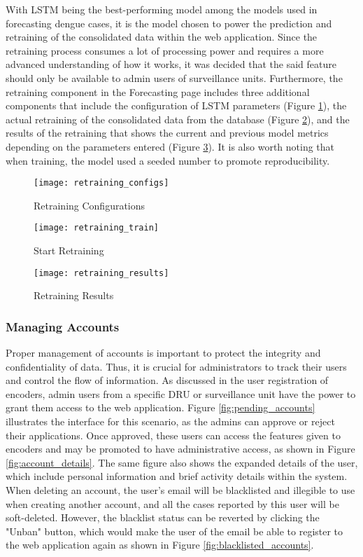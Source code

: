 With LSTM being the best-performing model among the models used in forecasting dengue cases, it is the model chosen to power the prediction and retraining of the consolidated data within the web application. Since the retraining process consumes a lot of processing power and requires a more advanced understanding of how it works, it was decided that the said feature should only be available to admin users of surveillance units. Furthermore, the retraining component in the Forecasting page includes three additional components that include the configuration of LSTM parameters (Figure \ref{fig:retraining_configs}), the actual retraining of the consolidated data from the database (Figure \ref{fig:retraining_train}), and the results of the retraining that shows the current and previous model metrics depending on the parameters entered (Figure \ref{fig:retraining_results}). It is also worth noting that when training, the model used a seeded number to promote reproducibility. 

\begin{figure}[H]
	\centering
	\texttt{[image: retraining\_configs]}
	\caption{Retraining Configurations}
	\label{fig:retraining_configs}
\end{figure}
\begin{figure}[H]
	\centering
	\texttt{[image: retraining\_train]}
	\caption{Start Retraining}
	\label{fig:retraining_train}
\end{figure}
\begin{figure}[H]
	\centering
	\texttt{[image: retraining\_results]}
	\caption{Retraining Results}
	\label{fig:retraining_results}
\end{figure}

\clearpage

\subsubsection{Managing Accounts}

Proper management of accounts is important to protect the integrity and confidentiality of data. Thus, it is crucial for administrators to track their users and control the flow of information. As discussed in the user registration of encoders, admin users from a specific DRU or surveillance unit have the power to grant them access to the web application. Figure \ref{fig:pending_accounts} illustrates the interface for this scenario, as the admins can approve or reject their applications. Once approved, these users can access the features given to encoders and may be promoted to have administrative access, as shown in Figure \ref{fig:account_details}. The same figure also shows the expanded details of the user, which include personal information and brief activity details within the system. When deleting an account, the user's email will be blacklisted and illegible to use when creating another account, and all the cases reported by this user will be soft-deleted. However, the blacklist status can be reverted by clicking the "Unban" button, which would make the user of the email be able to register to the web application again as shown in Figure \ref{fig:blacklisted_accounts}. 

